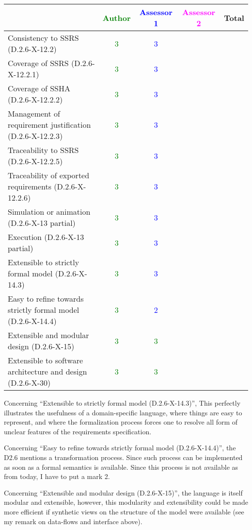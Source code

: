 \begin{tabular}{|l | c | c | c | c|}
\hline
& \textcolor{green}{Author} & \textcolor{blue}{Assessor 1} & \textcolor{magenta}{Assessor 2} & Total \\
\hline 
Consistency to SSRS (D.2.6-X-12.2) & \textcolor{green}{3} & \textcolor{blue}{3} & &  \\
\hline
Coverage of SSRS (D.2.6-X-12.2.1)  & \textcolor{green}{3} & \textcolor{blue}{3} & &  \\
\hline
Coverage of SSHA (D.2.6-X-12.2.2)  & \textcolor{green}{3} & \textcolor{blue}{3} & &  \\
\hline
Management of requirement justification (D.2.6-X-12.2.3)  & \textcolor{green}{3} & \textcolor{blue}{3} & &  \\
\hline
Traceability to  SSRS (D.2.6-X-12.2.5)  & \textcolor{green}{3} & \textcolor{blue}{3} & &  \\
\hline
Traceability of exported requirements (D.2.6-X-12.2.6)  & \textcolor{green}{3} & \textcolor{blue}{3} & &  \\
\hline
Simulation or animation (D.2.6-X-13 partial)  & \textcolor{green}{3} & \textcolor{blue}{3} & &  \\
\hline
Execution (D.2.6-X-13 partial)  & \textcolor{green}{3} & \textcolor{blue}{3} & &  \\
\hline
Extensible to strictly formal model (D.2.6-X-14.3) & \textcolor{green}{3} & \textcolor{blue}{3} & &  \\
\hline
Easy to refine towards strictly formal model (D.2.6-X-14.4) & \textcolor{green}{3} & \textcolor{blue}{2} & &  \\
\hline
Extensible and modular design (D.2.6-X-15)  & \textcolor{green}{3} & \textcolor{green}{3} & &  \\
\hline
Extensible to software architecture and design (D.2.6-X-30)   & \textcolor{green}{3} & \textcolor{green}{3} & &  \\
\hline
\end{tabular}


\begin{assessor1}
Concerning "`Extensible to strictly formal model (D.2.6-X-14.3)"', This perfectly illustrates the usefulness of a domain-specific language, where things are easy to represent, and where the formalization process forces one to resolve all form of unclear features of the requirements specification. 

Concerning "`Easy to refine towards strictly formal model (D.2.6-X-14.4)"', the D2.6 mentions a transformation process. Since such process can be implemented as soon as a formal semantics is available. Since this process is not available as from today, I have to put a mark 2. 

Concerning "`Extensible and modular design (D.2.6-X-15)"', the language is itself modular and extensible, however, this modularity and extensibility could be made more efficient if synthetic views on the structure of the model were available (see my remark on data-flows and interface above). 
\end{assessor1}


